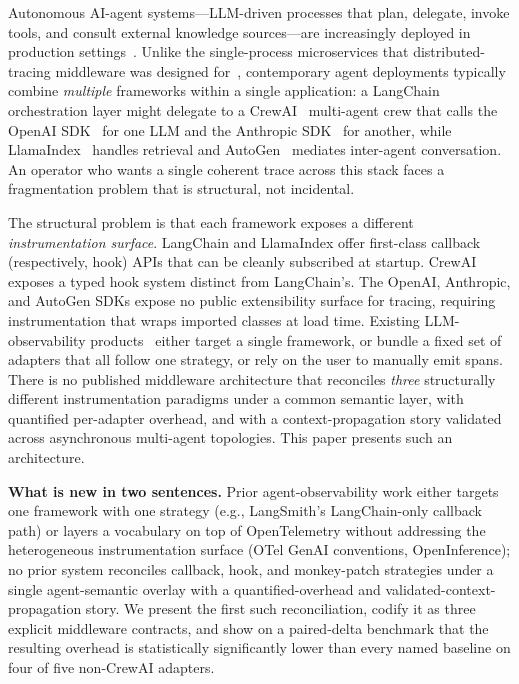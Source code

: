 \documentclass[sigconf,review,anonymous,9pt]{acmart}
\begin{document}
Autonomous AI-agent systems---LLM-driven processes that plan,
delegate, invoke tools, and consult external knowledge sources---are
increasingly deployed in production
settings~\cite{mast,aegis,agentdebug}. Unlike the single-process
microservices that distributed-tracing middleware was designed
for~\cite{dapper,jaeger,zipkin}, contemporary agent deployments
typically combine \emph{multiple} frameworks within a single
application: a LangChain~\cite{langchain} orchestration layer might
delegate to a CrewAI~\cite{crewai} multi-agent crew that calls the
OpenAI SDK~\cite{openai_sdk} for one LLM and the Anthropic
SDK~\cite{anthropic_sdk} for another, while LlamaIndex~\cite{llamaindex}
handles retrieval and AutoGen~\cite{autogen} mediates inter-agent
conversation. An operator who wants a single coherent trace across
this stack faces a fragmentation problem that is structural, not
incidental.

The structural problem is that each framework exposes a different
\emph{instrumentation surface}. LangChain and LlamaIndex offer
first-class callback (respectively, hook) APIs that can be cleanly
subscribed at startup. CrewAI exposes a typed hook system distinct
from LangChain's. The OpenAI, Anthropic, and AutoGen SDKs expose no
public extensibility surface for tracing, requiring instrumentation
that wraps imported classes at load time. Existing LLM-observability
products~\cite{langsmith,langfuse,openllmetry,openinference} either
target a single framework, or bundle a fixed set of adapters that all
follow one strategy, or rely on the user to manually emit spans.
There is no published middleware architecture that reconciles
\emph{three} structurally different instrumentation paradigms under a
common semantic layer, with quantified per-adapter overhead, and with
a context-propagation story validated across asynchronous multi-agent
topologies. This paper presents such an architecture.

\textbf{What is new in two sentences.} Prior agent-observability
work either targets one framework with one strategy (e.g.,
LangSmith's LangChain-only callback path) or layers a vocabulary on
top of OpenTelemetry without addressing the heterogeneous
instrumentation surface (OTel GenAI conventions, OpenInference);
no prior system reconciles callback, hook, and monkey-patch
strategies under a single agent-semantic overlay with a
quantified-overhead and validated-context-propagation story. We
present the first such reconciliation, codify it as three explicit
middleware contracts, and show on a paired-delta benchmark that the
resulting overhead is statistically significantly lower than every
named baseline on four of five non-CrewAI adapters.
\end{document}
